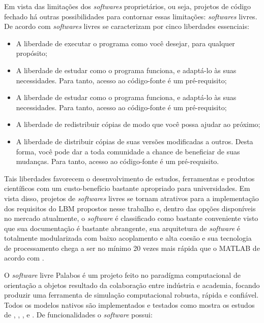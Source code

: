 Em vista das limitações dos \textit{softwares} proprietários, ou seja, projetos de código fechado há outras possibilidades para contornar essas limitações: \textit{softwares} livres. De acordo com  \textit{softwares} livres se caracterizam por cinco liberdades essenciais:

\begin{itemize}
  \item A liberdade de executar o programa como você desejar, para qualquer propósito;
  \item A liberdade de estudar como o programa funciona, e adaptá-lo às suas necessidades. Para tanto, acesso ao código-fonte é um pré-requisito;
  \item A liberdade de estudar como o programa funciona, e adaptá-lo às suas necessidades. Para tanto, acesso ao código-fonte é um pré-requisito;
  \item A liberdade de redistribuir cópias de modo que você possa ajudar ao próximo;
  \item A liberdade de distribuir cópias de suas versões modificadas a outros. Desta forma, você pode dar a toda comunidade a chance de beneficiar de suas mudanças. Para tanto, acesso ao código-fonte é um pré-requisito.
\end{itemize}

Tais liberdades favorecem o desenvolvimento de estudos, ferramentas e produtos científicos com um custo-benefício bastante apropriado para universidades. Em vista disso, projetos de \textit{softwares} livres se tornam atrativos para a implementação dos requisitos do LBM propostos nesse trabalho e, dentro das opções disponíveis no mercado atualmente, o \textit{software}  é classificado como bastante conveniente visto que sua documentação é bastante abrangente, sua arquitetura de \textit{software} é totalmente modularizada com baixo acoplamento e alta coesão e sua tecnologia de processamento chega a ser no mínimo 20 vezes mais rápida que o MATLAB de acordo com .   

O \textit{software} livre Palabos é um projeto feito no paradígma computacional de orientação a objetos resultado da colaboração entre indústria e academia, focando produzir uma ferramenta de simulação computacional robusta, rápida e confiável. Todos os modelos nativos são implementados e testados como mostra os estudos de , , ,  e . De funcionalidades o \textit{software} possui:

